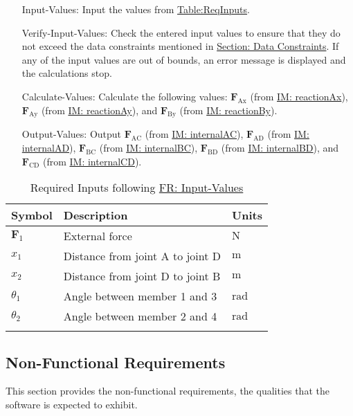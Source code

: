 \documentclass[12pt]{article}
\begin{document}
\begin{itemize}
\item[Input-Values:\phantomsection\label{inputValues}]{Input the values from \hyperref[Table:ReqInputs]{Table:ReqInputs}.}
\item[Verify-Input-Values:\phantomsection\label{verifyInVals}]{Check the entered input values to ensure that they do not exceed the data constraints mentioned in \hyperref[Sec:DataConstraints]{Section: Data Constraints}. If any of the input values are out of bounds, an error message is displayed and the calculations stop.}
\item[Calculate-Values:\phantomsection\label{calcValues}]{Calculate the following values: ${\mathbf{F}_{\text{Ax}}}$ (from \hyperref[IM:reactionAx]{IM: reactionAx}), ${\mathbf{F}_{\text{Ay}}}$ (from \hyperref[IM:reactionAy]{IM: reactionAy}), and ${\mathbf{F}_{\text{By}}}$ (from \hyperref[IM:reactionBy]{IM: reactionBy}).}
\item[Output-Values:\phantomsection\label{outputValues}]{Output ${\mathbf{F}_{\text{AC}}}$ (from \hyperref[IM:internalAC]{IM: internalAC}), ${\mathbf{F}_{\text{AD}}}$ (from \hyperref[IM:internalAD]{IM: internalAD}), ${\mathbf{F}_{\text{BC}}}$ (from \hyperref[IM:internalBC]{IM: internalBC}), ${\mathbf{F}_{\text{BD}}}$ (from \hyperref[IM:internalBD]{IM: internalBD}), and ${\mathbf{F}_{\text{CD}}}$ (from \hyperref[IM:internalCD]{IM: internalCD}).}
\end{itemize}
\begin{longtable}{l l l}
\toprule
\textbf{Symbol} & \textbf{Description} & \textbf{Units}
\\
\midrule
\endhead
${\mathbf{F}_{1}}$ & External force & ${\text{N}}$
\\
${x_{\text{1}}}$ & Distance from joint A to joint D & ${\text{m}}$
\\
${x_{\text{2}}}$ & Distance from joint D to joint B & ${\text{m}}$
\\
${θ_{\text{1}}}$ & Angle between member 1 and 3 & ${\text{rad}}$
\\
${θ_{\text{2}}}$ & Angle between member 2 and 4 & ${\text{rad}}$
\\
\bottomrule
\caption{Required Inputs following \hyperref[inputValues]{FR: Input-Values}}
\label{Table:ReqInputs}
\end{longtable}
\subsection{Non-Functional Requirements}
\label{Sec:NFRs}
This section provides the non-functional requirements, the qualities that the software is expected to exhibit.
\end{document}
